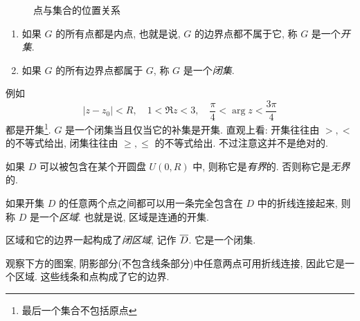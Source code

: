 \begin{figure}
  \centering
  \caption{点与集合的位置关系}
\end{figure}

\begin{definition}
  \begin{enumerate}
    \item 如果 $G$ 的所有点都是内点, 也就是说, $G$ 的边界点都不属于它, 称 $G$ 是一个\emph{开集}.
    \item 如果 $G$ 的所有边界点都属于 $G$, 称 $G$ 是一个\emph{闭集}.
  \end{enumerate}
\end{definition}
例如
  \[|z-z_0|<R,\quad 1<\Re z<3,\quad\frac\pi4<\arg z<\dfrac{3\pi}4\]
都是开集\footnote{最后一个集合不包括原点}.
$G$ 是一个闭集当且仅当它的补集是开集.
直观上看: 开集往往由 $>,<$ 的不等式给出, 闭集往往由 $\ge,\le$ 的不等式给出.
不过注意这并不是绝对的.

如果 $D$ 可以被包含在某个开圆盘 $U(0,R)$ 中, 则称它是\emph{有界}的.
否则称它是\emph{无界}的.

\begin{definition}
  如果开集 $D$ 的任意两个点之间都可以用一条完全包含在 $D$ 中的折线连接起来, 则称 $D$ 是一个\emph{区域}.
  也就是说, 区域是连通的开集.
\end{definition}
区域和它的边界一起构成了\emph{闭区域}, 记作 $\overline D$.
它是一个闭集.

观察下方的图案, 阴影部分(不包含线条部分)中任意两点可用折线连接, 因此它是一个区域.
这些线条和点构成了它的边界.

